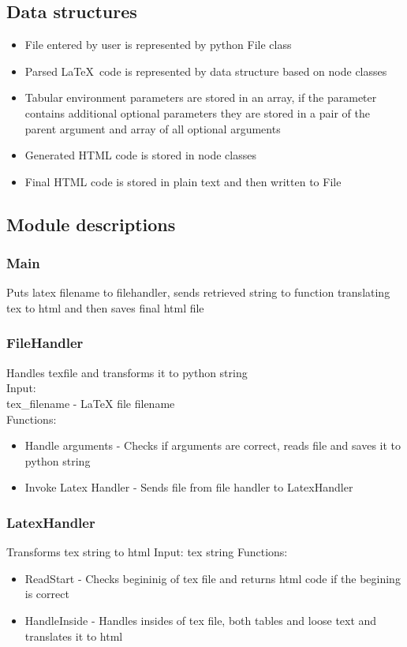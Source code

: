\documentclass[12pt]{article}
\begin{document}
\subsection{Data structures}
\begin{itemize}
\item File entered by user is represented by python File class 
\item Parsed \LaTeX \, code is represented by data structure based on node classes 
\item Tabular environment parameters are stored in an array, if the parameter contains additional optional parameters they are stored in a pair of the parent argument and array of all optional arguments 
\item Generated HTML code is stored in node classes 
\item Final HTML code is stored in plain text and then written to File
\end{itemize}

\subsection{Module descriptions}
\subsubsection{Main}
Puts latex filename to filehandler, sends retrieved string to function translating tex to html and then saves final html file 
\subsubsection{FileHandler}
Handles texfile and transforms it to python string \\ 
Input: \\ 
tex\_filename - LaTeX file filename \\ 
Functions: 
\begin{itemize}
    \item Handle arguments - Checks if arguments are correct, reads file and saves it to python string
    \item Invoke Latex Handler - Sends file from file handler to LatexHandler 
\end{itemize}
\subsubsection{LatexHandler}
Transforms tex string to html
Input: tex string
Functions: 
\begin{itemize}
    \item ReadStart - Checks begininig of tex file and returns html code if the begining is correct
    \item HandleInside - Handles insides of tex file, both tables and loose text and translates it to html
\end{itemize}
\end{document}
